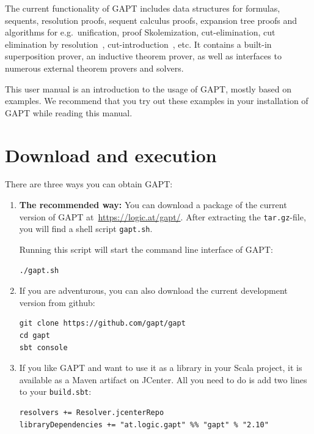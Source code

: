 \documentclass[a4paper,11pt]{book}
\begin{document}
The current functionality of GAPT includes data structures for formulas,
sequents, resolution proofs, sequent calculus proofs, expansion tree proofs and
algorithms for e.g.\ unification, proof Skolemization, cut-elimination, cut
elimination by resolution~\cite{Baaz00CutElimination},
cut-introduction~\cite{Hetzl2012}, etc. It contains a built-in superposition
prover, an inductive theorem prover, as well as interfaces to numerous external
theorem provers and solvers.

This user manual is an introduction to the usage of GAPT, mostly based on examples.
We recommend that you try out these examples in your installation of GAPT while
reading this manual.

\chapter{Download and execution}

There are three ways you can obtain GAPT:

\begin{enumerate}

\item {\bfseries The recommended way:}  You can download a package of the current
version of GAPT at~\url{https://logic.at/gapt/}.  After extracting
the \texttt{tar.gz}-file, you will find a shell script \texttt{gapt.sh}.

Running this script will start the command line interface of GAPT:
\begin{lstlisting}
./gapt.sh
\end{lstlisting}

\item If you are adventurous, you can also download the current development
  version from github:
\begin{lstlisting}
git clone https://github.com/gapt/gapt
cd gapt
sbt console
\end{lstlisting}

\item If you like GAPT and want to use it as a library in your Scala project,
  it is available as a Maven artifact on JCenter.  All you need to do is add
  two lines to your \verb,build.sbt,:
\begin{lstlisting}
resolvers += Resolver.jcenterRepo
libraryDependencies += "at.logic.gapt" %% "gapt" % "2.10"
\end{lstlisting}

\end{enumerate}
\end{document}
